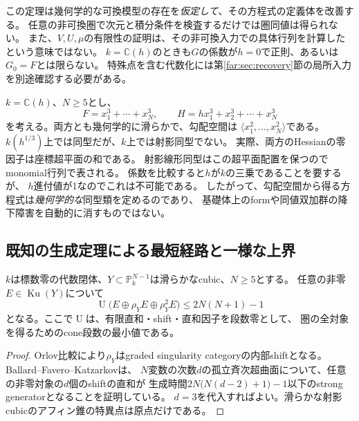 \begin{remark}[存在証明と実計算の違い]\label{gcd:rem:limits}
この定理は幾何学的な可換模型の存在を\emph{仮定して}、その方程式の定義体を改善する。
任意の非可換圏で次元と積分条件を検査するだけでは圏同値は得られない。
また、$V,U,\mu$の有限性の証明は、その非可換入力での具体行列を計算したという意味ではない。
$k=\mathbb C(h)$のときも$G$の係数が$h=0$で正則、あるいは$G_0=F$とは限らない。
特殊点を含む代数化には第\ref{far:sec:recovery}節の局所入力を別途確認する必要がある。
\end{remark}

\begin{example}[同じ勾配空間でも基礎体上の同型類は一意でない]
\label{gcd:ex:forms}
$k=\mathbb C(h)$、$N\ge5$とし、
\[
 F=x_1^3+\cdots+x_N^3,\qquad
 H=h x_1^3+x_2^3+\cdots+x_N^3
\]
を考える。両方とも幾何学的に滑らかで、勾配空間は
$\langle x_1^2,\ldots,x_N^2\rangle$である。
$k(h^{1/3})$上では同型だが、$k$上では射影同型でない。
実際、両方のHessianの零因子は座標超平面の和である。
射影線形同型はこの超平面配置を保つのでmonomial行列で表される。
係数を比較すると$h$が$k$の三乗であることを要するが、
$h$進付値が1なのでこれは不可能である。
したがって、勾配空間から得る方程式は\emph{幾何学的な}同型類を定めるのであり、
基礎体上のformや同値双加群の降下障害を自動的に消すものではない。
\end{example}

\subsection{既知の生成定理による最短経路と一様な上界}

\begin{proposition}
\label{gcd:prop:bound}
$k$は標数零の代数閉体、$Y\subset\mathbb P^{N-1}_k$は滑らかなcubic、$N\ge5$とする。
任意の非零$E\in\operatorname{Ku}(Y)$について
\begin{equation}\label{gcd:eq:bound}
 \operatorname U\bigl(E\oplus\rho_YE\oplus\rho_Y^2E\bigr)
 \le 2N(N+1)-1
\end{equation}
となる。ここで$\operatorname U$は、有限直和・shift・直和因子を段数零として、
圏の全対象を得るためのcone段数の最小値である。
\end{proposition}
\begin{proof}
Orlov比較により$\rho_Y$はgraded singularity categoryの内部shiftとなる。
Ballard--Favero--Katzarkov\cite[Theorem~5.15]{GCDBFK}は、
$N$変数の次数$d$の孤立斉次超曲面について、任意の非零対象の$d$個のshiftの直和が
生成時間$2N\bigl(N(d-2)+1\bigr)-1$以下のstrong generatorとなることを証明している。
$d=3$を代入すればよい。滑らかな射影cubicのアフィン錐の特異点は原点だけである。
\end{proof}


